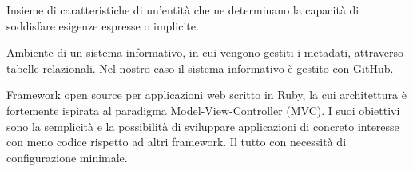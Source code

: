 
\begin{itemize}


Insieme di caratteristiche di un'entità che ne determinano la capacità di soddisfare esigenze espresse o implicite.

\end{itemize}


\begin{itemize}


Ambiente di un sistema informativo, in cui vengono gestiti i metadati, attraverso tabelle relazionali.
Nel nostro caso il sistema informativo è gestito con GitHub.


Framework open source per applicazioni web scritto in Ruby, la cui architettura è fortemente ispirata al paradigma Model-View-Controller (MVC). I suoi obiettivi sono la semplicità e la possibilità di sviluppare applicazioni di concreto interesse con meno codice rispetto ad altri framework. Il tutto con necessità di configurazione minimale.

\end{itemize}


